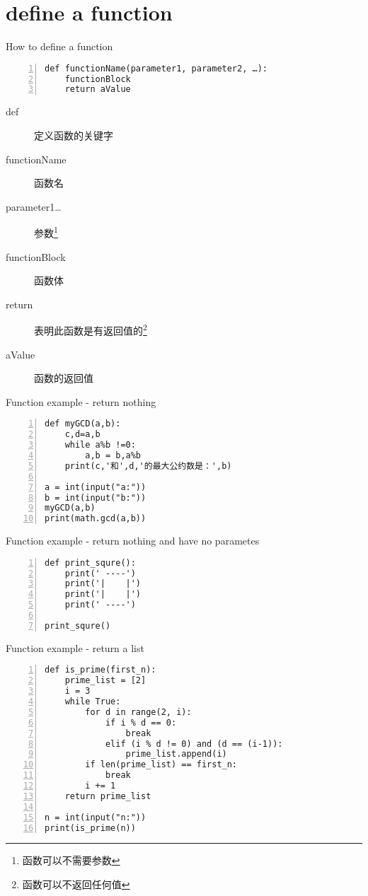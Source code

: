 \documentclass{beamer}
\begin{document}
\section{define a function}
\begin{frame}[fragile]{How to define a function}
\begin{Verbatim}[numbers=left,frame=single,rulecolor=\color{red}]
def functionName(parameter1, parameter2, …):
    functionBlock
    return aValue
\end{Verbatim}
\begin{description}
\item[ def ] 定义函数的关键字
\item[ functionName ] 函数名
\item[ parameter1…] 参数\footnote{函数可以不需要参数}
\item[ functionBlock ] 函数体
\item[ return ] 表明此函数是有返回值的\footnote{函数可以不返回任何值}
\item[ aValue ] 函数的返回值 
\end{description}

\end{frame}

\begin{frame}[fragile]{Function example - return nothing}
\begin{Verbatim}[numbers=left,frame=single,rulecolor=\color{red}]
def myGCD(a,b):
    c,d=a,b
    while a%b !=0:
        a,b = b,a%b
    print(c,'和',d,'的最大公约数是：',b)

a = int(input("a:"))
b = int(input("b:"))
myGCD(a,b)
print(math.gcd(a,b))
\end{Verbatim}
\end{frame}

\begin{frame}[fragile]{Function example - return nothing and have no parametes}
\begin{Verbatim}[numbers=left,frame=single,rulecolor=\color{red}]
def print_squre():
    print(' ----')
    print('|    |')
    print('|    |')
    print(' ----')

print_squre()
\end{Verbatim}
\end{frame}

\begin{frame}[fragile]{Function example - return a list}
\begin{Verbatim}[numbers=left,frame=single,rulecolor=\color{red}]
def is_prime(first_n):
    prime_list = [2]
    i = 3
    while True:
        for d in range(2, i):
            if i % d == 0:
                break
            elif (i % d != 0) and (d == (i-1)):
                prime_list.append(i)
        if len(prime_list) == first_n:
            break
        i += 1
    return prime_list

n = int(input("n:"))
print(is_prime(n))
\end{Verbatim}
\end{frame}
\end{document}
